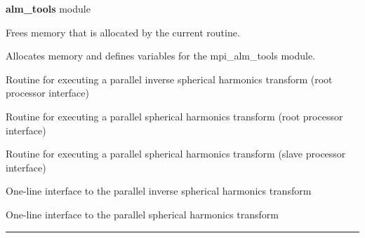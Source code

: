 \begin{modules}
  \begin{sulist}{} %
  \item[\textbf{alm\_tools}] module
  \end{sulist}
\end{modules}

\begin{related}
  \begin{sulist}{} %
   \item[\htmlref{mpi\_cleanup\_alm\_tools}{sub:mpi_cleanup_alm_tools}] Frees memory that is allocated by the current routine. 
   \item[\htmlref{mpi\_initialize\_alm\_tools}{sub:mpi_initialize_alm_tools}] Allocates memory and defines variables for the mpi\_alm\_tools module. 
  \item[\htmlref{mpi\_alm2map}{sub:mpi_alm2map}] Routine for executing a parallel inverse spherical harmonics transform (root processor interface)
  \item[\htmlref{mpi\_map2alm}{sub:mpi_map2alm}] Routine for executing a parallel spherical harmonics transform (root processor interface)
  \item[\htmlref{mpi\_map2alm\_slave}{sub:mpi_map2alm_slave}] Routine for executing a parallel spherical harmonics transform (slave processor interface)
  \item[\htmlref{mpi\_alm2map\_simple}{sub:mpi_alm2map_simple}] One-line interface to the parallel inverse spherical harmonics transform 
  \item[\htmlref{mpi\_map2alm\_simple}{sub:mpi_map2alm_simple}] One-line interface to the parallel spherical harmonics transform 
  \end{sulist}
\end{related}

\rule{\hsize}{2mm}

\newpage
